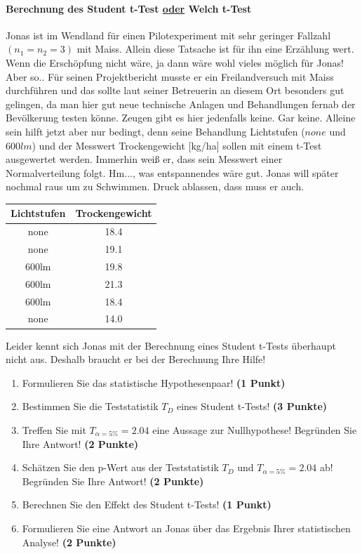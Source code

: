 \documentclass[a4paper, 9pt]{scrartcl}\usepackage[]{graphicx}\usepackage[]{xcolor}
\begin{document}
\ifcollection
\paragraph{Berechnung des Student t-Test \underline{oder} Welch t-Test}
\fi

Jonas ist im Wendland für einen Pilotexperiment mit sehr geringer Fallzahl $(n_1 = n_2 = 3)$ mit Maiss. Allein diese Tatsache ist für ihn eine Erzählung wert. Wenn die Erschöpfung nicht wäre, ja dann wäre wohl vieles möglich für Jonas! Aber so..  Für seinen Projektbericht musste er ein Freilandversuch mit Maiss durchführen und das sollte laut seiner Betreuerin an diesem Ort besonders gut gelingen, da man hier gut neue technische Anlagen und Behandlungen fernab der Bevölkerung testen könne. Zeugen gibt es hier jedenfalls keine. Gar keine.  Alleine sein hilft jetzt aber nur bedingt, denn seine Behandlung Lichtstufen ($none$ und $600lm$) und der Messwert Trockengewicht [kg/ha] sollen mit einem t-Test ausgewertet werden. Immerhin weiß er, dass sein Messwert einer Normalverteilung folgt. Hm..., was entspannendes wäre gut. Jonas will später nochmal raus um zu Schwimmen. Druck ablassen, dass muss er auch.

\begin{table}[!h]
\centering
\begin{tabular}{cc}
\toprule
Lichtstufen & Trockengewicht\\
\midrule
none & 18.4\\
none & 19.1\\
600lm & 19.8\\
600lm & 21.3\\
600lm & 18.4\\
\addlinespace
none & 14.0\\
\bottomrule
\end{tabular}
\end{table}



Leider kennt sich Jonas mit der Berechnung eines Student t-Tests überhaupt nicht aus. Deshalb braucht er bei der Berechnung Ihre Hilfe!

\begin{enumerate}
  \item Formulieren Sie das statistische Hypothesenpaar! \textbf{(1 Punkt)}
  \item Bestimmen Sie die Teststatistik $T_{D}$ eines Student t-Tests! \textbf{(3 Punkte)}
  \item Treffen Sie mit $T_{\alpha = 5\%} = 2.04$ eine Aussage zur Nullhypothese! Begründen Sie Ihre Antwort! \textbf{(2 Punkte)}
  \item Schätzen Sie den p-Wert aus der Teststatistik $T_{D}$ und $T_{\alpha = 5\%} = 2.04$ ab! Begründen Sie Ihre Antwort! \textbf{(2 Punkte)}
  \item Berechnen Sie den Effekt des Student t-Tests! \textbf{(1 Punkt)}
  \item Formulieren Sie eine Antwort an Jonas über das Ergebnis Ihrer statistischen Analyse! \textbf{(2 Punkte)}
\end{enumerate} 
\clearpage
\end{document}
